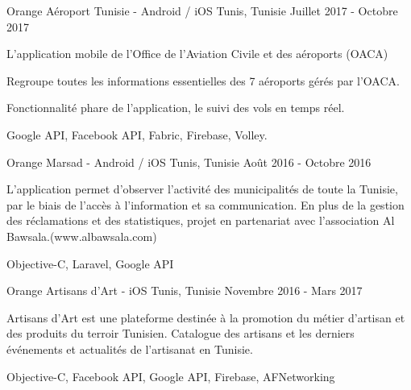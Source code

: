 

\begin{cventries}

  \cventrydetailed
    {Orange} %
    {Aéroport Tunisie - Android / iOS} %
    {Tunis, Tunisie} %
    {Juillet 2017 - Octobre 2017} %
    {
      \begin{cvitems} %
        \item {L'application mobile de l’Office de l’Aviation Civile et des aéroports (OACA)}
        \item {Regroupe toutes les informations essentielles des 7 aéroports gérés par l’OACA.}
        \item {Fonctionnalité phare de l’application, le suivi des vols en temps réel.}
      \end{cvitems}
    }
    {Google API, Facebook API, Fabric, Firebase, Volley.} %
    
  \cventrydetailed
    {Orange} %
	{Marsad - Android / iOS} %
	{Tunis, Tunisie} %
	{Août 2016 - Octobre 2016} %
	{
		\begin{cvitems} %
			\item {L’application permet d’observer l’activité des municipalités de toute la Tunisie, par le biais de l’accès à l’information et sa communication. En plus de la gestion des réclamations et des statistiques, projet en partenariat avec l’association Al Bawsala.(www.albawsala.com)}
		\end{cvitems}
	}
	{Objective-C, Laravel, Google API} %

  \cventrydetailed
    {Orange} %
    {Artisans d'Art - iOS} %
    {Tunis, Tunisie} %
    {Novembre 2016 - Mars 2017} %
    {
      \begin{cvitems} %
        \item {Artisans d’Art est une plateforme destinée à la promotion du métier d’artisan et des produits du terroir Tunisien. Catalogue des artisans et les derniers événements et actualités de l’artisanat en Tunisie.}
      \end{cvitems}
    }
    {Objective-C, Facebook API, Google API, Firebase, AFNetworking} %
    

\end{cventries}
